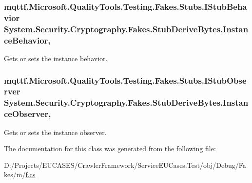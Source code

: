 \hypertarget{class_system_1_1_security_1_1_cryptography_1_1_fakes_1_1_stub_derive_bytes_a1fd55d9509ebad55e06fa9ea38743027}{
\subsubsection[{Instance\-Behavior}]{\setlength{\rightskip}{0pt plus 5cm}mqttf.\-Microsoft.\-Quality\-Tools.\-Testing.\-Fakes.\-Stubs.\-I\-Stub\-Behavior System.\-Security.\-Cryptography.\-Fakes.\-Stub\-Derive\-Bytes.\-Instance\-Behavior\hspace{0.3cm}{\ttfamily [get]}, {\ttfamily [set]}}}\label{class_system_1_1_security_1_1_cryptography_1_1_fakes_1_1_stub_derive_bytes_a1fd55d9509ebad55e06fa9ea38743027}


Gets or sets the instance behavior.

\hypertarget{class_system_1_1_security_1_1_cryptography_1_1_fakes_1_1_stub_derive_bytes_aca28c55d2e572bf87961337e9eba6856}{
\subsubsection[{Instance\-Observer}]{\setlength{\rightskip}{0pt plus 5cm}mqttf.\-Microsoft.\-Quality\-Tools.\-Testing.\-Fakes.\-Stubs.\-I\-Stub\-Observer System.\-Security.\-Cryptography.\-Fakes.\-Stub\-Derive\-Bytes.\-Instance\-Observer\hspace{0.3cm}{\ttfamily [get]}, {\ttfamily [set]}}}\label{class_system_1_1_security_1_1_cryptography_1_1_fakes_1_1_stub_derive_bytes_aca28c55d2e572bf87961337e9eba6856}


Gets or sets the instance observer.



The documentation for this class was generated from the following file\-:\begin{DoxyCompactItemize}
\item 
D\-:/\-Projects/\-E\-U\-C\-A\-S\-E\-S/\-Crawler\-Framework/\-Service\-E\-U\-Cases.\-Test/obj/\-Debug/\-Fakes/m/\hyperlink{m_2f_8cs}{f.\-cs}\end{DoxyCompactItemize}
